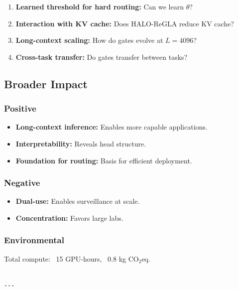 \begin{enumerate}
\item \textbf{Learned threshold for hard routing:} Can we learn $\theta$?
\item \textbf{Interaction with KV cache:} Does HALO-ReGLA reduce KV cache?
\item \textbf{Long-context scaling:} How do gates evolve at $L = 4096$?
\item \textbf{Cross-task transfer:} Do gates transfer between tasks?

\end{enumerate}
\subsection{Broader Impact}

\subsubsection{Positive}
\begin{itemize}
\item \textbf{Long-context inference:} Enables more capable applications.
\item \textbf{Interpretability:} Reveals head structure.
\item \textbf{Foundation for routing:} Basis for efficient deployment.

\end{itemize}
\subsubsection{Negative}
\begin{itemize}
\item \textbf{Dual-use:} Enables surveillance at scale.
\item \textbf{Concentration:} Favors large labs.

\end{itemize}
\subsubsection{Environmental}
Total compute: ~15 GPU-hours, ~0.8 kg CO$_2$eq.
\begin{lstlisting}

---
\end{lstlisting}